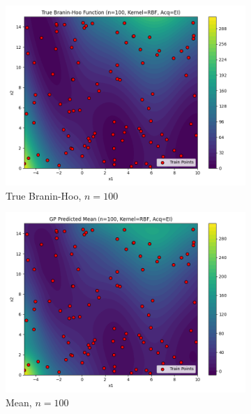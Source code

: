 \documentclass[a4paper,12pt]{article}
\begin{document}
\begin{figure}[H]
\begin{subfigure}{0.3\textwidth}
  \includegraphics[width=\linewidth]{Task-02/images/true_function_rbf_n100_EI.png}
  \caption{True Branin-Hoo, $n=100$}
\end{subfigure}
\begin{subfigure}{0.3\textwidth}
    \includegraphics[width=\linewidth]{Task-02/images/gp_mean_rbf_n100_EI.png}
    \caption{Mean, $n=100$}
\end{subfigure}
\begin{subfigure}{0.3\textwidth}

\end{subfigure}
\end{figure}
\end{document}
